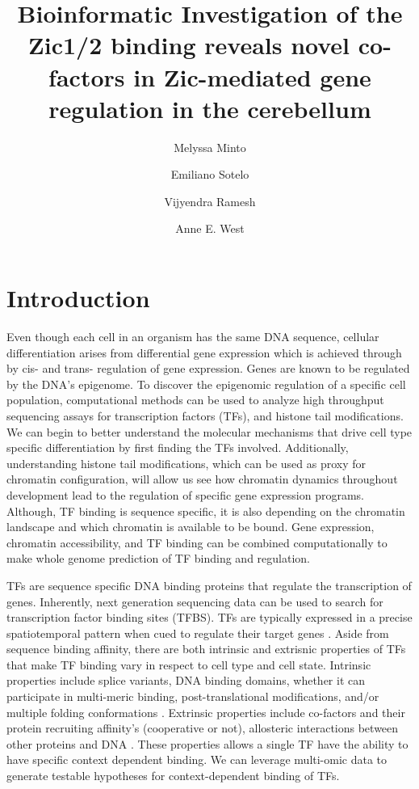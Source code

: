\documentclass[fleqn,10pt,twocolumn]{wlscirep}
\title{Bioinformatic Investigation of the Zic1/2 binding  reveals novel co-factors in Zic-mediated gene regulation in the cerebellum}
\author[1]{Melyssa Minto}
\author[2]{Emiliano Sotelo}
\author[3]{Vijyendra  Ramesh}
\author[3,*]{Anne E. West}
\affil[1]{Duke University, Computational Biology and Bioinformatics, Durham, 27710}
\affil[2]{Duke University, University Program of Genetics and Genomics, Durham, 27710}
\affil[3]{Duke University, Neurobiology, Durham, 27710}
\affil[*]{corresponding author: west@neuro.duke.edu}
\begin{document}
\flushbottom
\maketitle
\thispagestyle{empty}

\section*{Introduction}
Even though each cell in an organism has the same DNA sequence, cellular differentiation arises from differential gene expression which is achieved through by cis- and trans- regulation of gene expression. Genes are known to be regulated by the DNA’s epigenome. To discover the epigenomic regulation of a specific cell population, computational methods can be used to analyze high throughput sequencing assays for transcription factors (TFs), and histone tail modifications. We can begin to better understand the molecular mechanisms that drive cell type specific differentiation by first finding the TFs involved. Additionally, understanding histone tail modifications, which can be used as proxy for chromatin configuration, will allow us see how chromatin dynamics throughout development lead to the regulation of specific gene expression programs. Although, TF binding is sequence specific, it is also depending on the chromatin landscape and which chromatin is available to be bound. Gene expression, chromatin accessibility, and TF binding can be combined computationally to make whole genome prediction of TF binding and regulation.

TFs are sequence specific DNA binding proteins that regulate the transcription of genes. Inherently, next generation sequencing data can be used to search for transcription factor binding sites (TFBS).  TFs are typically expressed in a precise spatiotemporal pattern when cued to regulate their target genes \cite{}. Aside from sequence binding affinity, there are both intrinsic and extrisnic properties of TFs that make TF binding vary in respect to cell type and cell state.  Intrinsic properties include splice variants, DNA binding domains, whether it can participate in multi-meric binding, post-translational modifications, and/or multiple folding conformations \cite{Siggers2014Protein-DNACodes, Slattery2014AbsenceGenome}. Extrinsic properties include co-factors and their protein recruiting affinity's (cooperative or not), allosteric interactions between other proteins and DNA \cite{Siggers2014Protein-DNACodes}. These properties allows a single TF have the ability to have specific context dependent binding. We can leverage multi-omic data to generate testable hypotheses for context-dependent binding of TFs.
 
\end{document}
